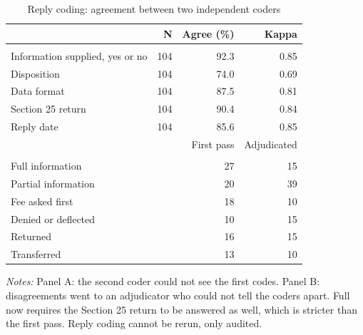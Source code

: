 \begin{table}[!htbp]
\centering
\caption{Reply coding: agreement between two independent coders}
\label{tab:tab_coding}
\small
\begin{threeparttable}
\begin{tabular}{lrrr}
\toprule
 & N & Agree (\%) & Kappa \\
\midrule
\addlinespace\multicolumn{4}{l}{\textit{Panel A. Agreement}} \\
Information supplied, yes or no & 104 & 92.3 & 0.85 \\
Disposition & 104 & 74.0 & 0.69 \\
Data format & 104 & 87.5 & 0.81 \\
Section 25 return & 104 & 90.4 & 0.84 \\
Reply date & 104 & 85.6 & 0.85 \\
\midrule
 &  & First pass & Adjudicated \\
\addlinespace\multicolumn{4}{l}{\textit{Panel B. Disposition counts}} \\
Full information &  & 27 & 15 \\
Partial information &  & 20 & 39 \\
Fee asked first &  & 18 & 10 \\
Denied or deflected &  & 10 & 15 \\
Returned &  & 16 & 15 \\
Transferred &  & 13 & 10 \\
\bottomrule
\end{tabular}
\begin{tablenotes}[flushleft]\footnotesize
\item \textit{Notes:} Panel A: the second coder could not see the first codes. Panel B: disagreements went to an adjudicator who could not tell the coders apart. Full now requires the Section 25 return to be answered as well, which is stricter than the first pass. Reply coding cannot be rerun, only audited.
\end{tablenotes}
\end{threeparttable}
\end{table}
